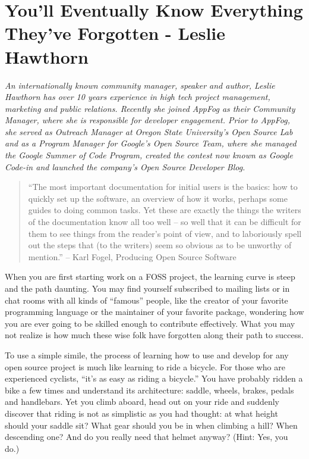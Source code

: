 \chapter{You’ll Eventually Know Everything They’ve Forgotten - Leslie Hawthorn}

\textit{An internationally known community manager, speaker and author, Leslie
Hawthorn has over 10 years experience in high tech project management, marketing
and public relations. Recently she joined AppFog as their Community
Manager, where she is responsible for developer engagement. Prior to AppFog, she
served as Outreach Manager at Oregon State University’s Open Source Lab and as a
Program Manager for Google’s Open Source Team, where she managed the Google
Summer of Code Program, created the contest now known as Google Code-in and
launched the company’s Open Source Developer Blog.}

\begin{quote}
``The most important documentation for initial users is the basics: how to
quickly set up the software, an overview of how it works, perhaps some guides to
doing common tasks. Yet these are exactly the things the writers of the
documentation know all too well -- so well that it can be difficult for them to see
things from the reader's point of view, and to laboriously spell out the steps
that (to the writers) seem so obvious as to be unworthy of mention.'' -- Karl
Fogel, Producing Open Source Software
\end{quote}

When you are first starting work on a FOSS project, the learning curve is steep
and the path daunting. You may find yourself subscribed to mailing lists or in
chat rooms with all kinds of ``famous'' people, like the creator of your
favorite programming language or the maintainer of your favorite package,
wondering how you are ever going to be skilled enough to contribute effectively.
What you may not realize is how much these wise folk have forgotten along their
path to success.

To use a simple simile, the process of learning how to use and develop for any
open source project is much like learning to ride a bicycle. For those who are
experienced cyclists, ``it’s as easy as riding a bicycle.'' You have probably
ridden a bike a few times and understand its architecture: saddle, wheels,
brakes, pedals and handlebars. Yet you climb aboard, head out on your ride and
suddenly discover that riding is not as simplistic as you had thought: at what
height should your saddle sit? What gear should you be in when climbing a hill?
When descending one? And do you really need that helmet anyway? (Hint: Yes, you
do.) 

